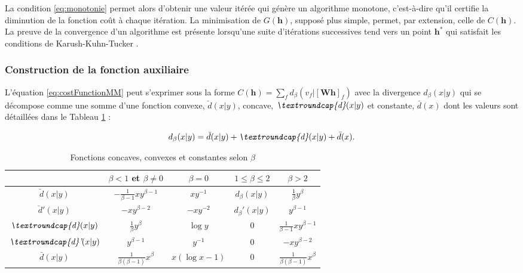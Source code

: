 La condition \ref{eq:monotonie} permet alors d'obtenir une valeur itérée qui génère un algorithme monotone, c'est-à-dire qu'il certifie la diminution de la fonction coût à chaque itération. La minimisation de $G(\mathbf{h})$, supposé plus simple, permet,  par extension, celle de $C(\mathbf{h})$. La preuve de la convergence d'un algorithme est présente lorsqu'une suite d'itérations successives tend vers un point $\mathbf{h^*}$ qui satisfait les conditions de Karush-Kuhn-Tucker \cite{fevotte_algorithms_2011, kuhn1982nonlinear}.

\subsubsection{Construction de la fonction auxiliaire}

L'équation \ref{eq:costFunctionMM} peut s'exprimer sous la forme $C(\mathbf{h}) = \sum_f d_{\beta}\left(v_f \vert \left[ \mathbf{Wh} \right]_f \right)$ avec la divergence $d_{\beta}(x \vert y)$ qui se décompose comme une somme d'une fonction convexe,  $\breve{d}(x\vert y)$, concave, $\textit{\textroundcap{d}}(x\vert y)$ et constante, $\bar{d}(x)$ dont les valeurs sont détaillées dans le Tableau \ref{tab:fonctionConcaveConvexe} :

\begin{equation}
d_{\beta}(x\vert y) = \breve{d}(x\vert y) + \textit{\textroundcap{d}}(x\vert y) + \bar{d}(x).
\end{equation}

\begin{table}[t]
\centering
	\begin{tabular}{|*{5}{c|}}
 		\hline
   		 & $\beta < 1$ et $\beta \neq 0$  & $\beta = 0$ & $1 \leq \beta \leq 2$ & $\beta > 2$  \\
   		\hline
   		$\breve{d}(x\vert y)$&$-\frac{1}{\beta -1}xy^{\beta-1}$ & $xy^{-1}$ & $d_{\beta}(x\vert y)$& $\frac{1}{\beta}y^{\beta}$ \\
   		\hline
   		$\breve{d}'(x\vert y)$& $-xy^{\beta-2}$ & $-xy^{-2}$ & $d_{\beta}'(x\vert y)$ & $y^{\beta-1}$\\
   		\hline
   		$\textit{\textroundcap{d}}(x\vert y)$& $\frac{1}{\beta}y^{\beta}$ & $\log y$ & 0 & $\frac{1}{\beta-1}xy^{\beta-1}$ \\
   		\hline
   		$\textit{\textroundcap{d}'}(x\vert y)$& $y^{\beta-1}$ & $y^{-1}$ & 0 & $-xy^{\beta-2}$ \\
   		\hline
   		$\bar{d}(x\vert y)$& $\frac{1}{\beta(\beta-1)}x^{\beta}$ & $x(\log x-1)$ & 0 & $\frac{1}{\beta(\beta-1)}x^{\beta}$\\
   		\hline
 	\end{tabular}
\caption{Fonctions concaves, convexes et constantes selon $\beta$}
\label{tab:fonctionConcaveConvexe}
\end{table}

